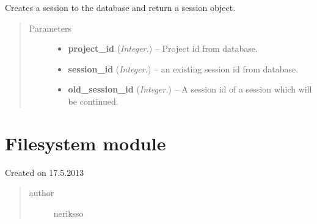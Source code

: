 \documentclass[letterpaper,10pt,english]{sphinxmanual}
\begin{document}

\begin{fulllineitems}
\label{controller:controller.StartNewSession}
Creates a session to the database and return a session object.
\begin{quote}\begin{description}
\item[{Parameters}] \leavevmode\begin{itemize}
\item {} 
\textbf{project\_id} (\emph{Integer.}) -- Project id from database.

\item {} 
\textbf{session\_id} (\emph{Integer.}) -- an existing session id from database.

\item {} 
\textbf{old\_session\_id} (\emph{Integer.}) -- A session id of a session which will be continued.

\end{itemize}

\end{description}\end{quote}

\end{fulllineitems}



\section{Filesystem module}
\label{filesystem:module-filesystem}\label{filesystem::doc}\label{filesystem:filesystem-module}
Created on 17.5.2013
\begin{quote}\begin{description}
\item[{author}] \leavevmode
neriksso

\end{description}\end{quote}
\end{document}
